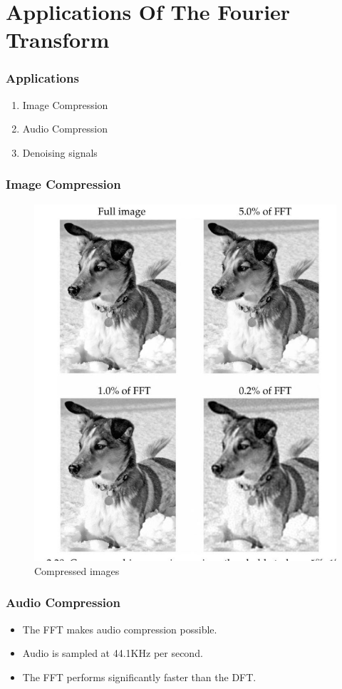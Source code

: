 \documentclass{beamer}
\begin{document}
\section{Applications Of The Fourier Transform}
\begin{frame}
	\frametitle{Applications}
	\begin{enumerate}
		\item Image Compression
		\item Audio Compression
		\item Denoising signals
	\end{enumerate}
	
\end{frame}
\begin{frame}
	\frametitle{Image Compression}
 \begin{figure} [h]
     \centering
     \includegraphics[trim = 0 10 0 0, width=0.5\linewidth, clip]{../pictures/Screenshot 2024-05-22 122030.png}
     \caption{Compressed images} \label{fig:2}
 \end{figure}
\end{frame}
\begin{frame}
	\frametitle{Audio Compression}
	\begin{itemize}
\item The FFT makes audio compression possible.
\item Audio is sampled at 44.1KHz per second.
\item The FFT performs significantly faster than the DFT.
\end{itemize}
\end{frame}
\end{document}
